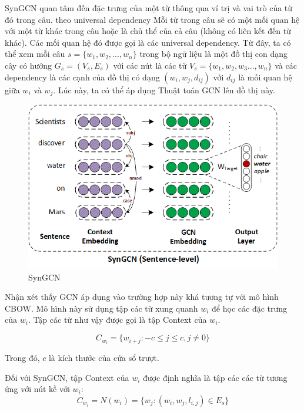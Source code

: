 SynGCN quan tâm đến đặc trưng của một từ thông qua ví trị và vai trò của từ đó trong câu. theo universal dependency Mỗi từ trong câu sẽ có một mối quan hệ với một từ khác trong câu hoặc là chủ thể của cả câu (không có liên kết đến từ khác). Các mối quan hệ đó được gọi là các universal dependency. Từ đây, ta có thể xem mỗi câu $s = \{w_1, w_2,...,w_n\}$ trong bộ ngữ liệu là một đồ thị con dạng cây có hướng $G_s = (V_s, E_s)$ với các nút là các từ $V_s=\{w_1, w_2, w_3...,w_n\}$ và các dependency là các cạnh của đồ thị có dạng $(w_i, w_j, d_{ij})$ với $d_{ij}$ là mối quan hệ giữa $w_i$ và $w_j$. Lúc này, ta có thể áp dụng Thuật toán GCN lên đồ thị này. 

\begin{figure}[H]
    \begin{center}
        \includegraphics[scale=1.0]{images/syngcn_model}
        \caption{SynGCN}
        \label{fig:syngcn}
    \end{center}
\end{figure}


Nhận xét thấy GCN áp dụng vào trường hợp này khá tương tự với mô hình CBOW. Mô hình này sử dụng tập các từ xung quanh $w_i$ để học các đặc trưng của $w_i$. Tập các từ như vậy được gọi là tập Context của $w_i$.

\begin{equation*}
	C_{w_i} = \{w_{i+j}: -c \leq j \leq c, j \neq 0\}
\end{equation*}

Trong đó, $c$ là kích thước của cửa sổ trượt.

Đối với SynGCN, tập Context của $w_i$ được định nghĩa là tập các các từ tương ứng với nút kề với $w_i$:
\begin{equation*}
	C_{w_i} = N(w_i) = \{w_j: (w_i, w_j, l_{i,j}) \in E_s\}
\end{equation*}


